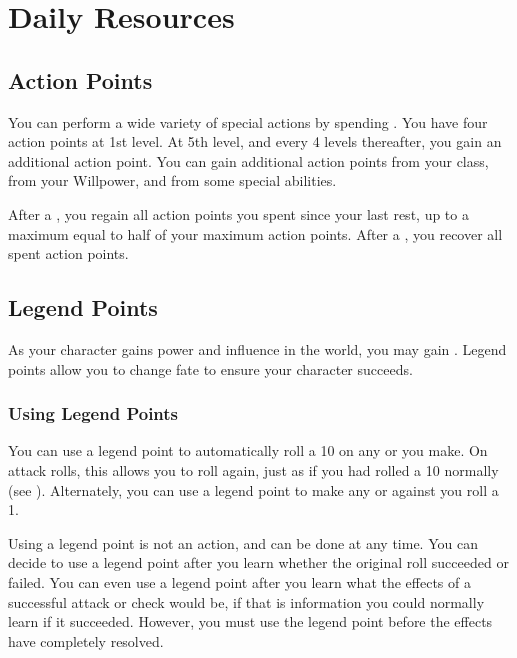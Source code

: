 \section{Daily Resources}

    \subsection{Action Points}\label{Action Points}
        You can perform a wide variety of special actions by spending .
        You have four action points at 1st level.
        At 5th level, and every 4 levels thereafter, you gain an additional action point.
        You can gain additional action points from your class, from your Willpower, and from some special abilities.

        After a , you regain all action points you spent since your last rest, up to a maximum equal to half of your maximum action points.
        After a , you recover all spent action points.

    \subsection{Legend Points}\label{Legend Points}

        As your character gains power and influence in the world, you may gain .
        Legend points allow you to change fate to ensure your character succeeds.

        \subsubsection{Using Legend Points}
            You can use a legend point to automatically roll a 10 on any  or  you make.
            On attack rolls, this allows you to roll again, just as if you had rolled a 10 normally (see ).
            Alternately, you can use a legend point to make any  or  against you roll a 1.

            Using a legend point is not an action, and can be done at any time.
            You can decide to use a legend point after you learn whether the original roll succeeded or failed.
            You can even use a legend point after you learn what the effects of a successful attack or check would be, if that is information you could normally learn if it succeeded.
            However, you must use the legend point before the effects have completely resolved.


